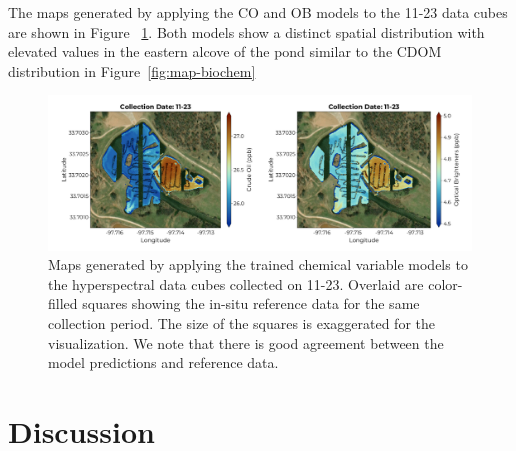 \documentclass[remotesensing,article,submit,pdftex,moreauthors]{Definitions/mdpi}
\begin{document}
The maps generated by applying the CO and OB models to the 11-23 data cubes are shown in Figure ~\ref{fig:map-chem}. Both models show a distinct spatial distribution with elevated values in the eastern alcove of the pond similar to the CDOM distribution in Figure~\ref{fig:map-biochem}

\begin{figure}
\centering
\includegraphics[width=\columnwidth]{paper/figures/results/maps/chemical.pdf}
\caption{Maps generated by applying the trained chemical variable models to the hyperspectral data cubes collected on 11-23. Overlaid are color-filled squares showing the in-situ reference data for the same collection period. The size of the squares is exaggerated for the visualization. We note that there is good agreement between the model predictions and reference data.\label{fig:map-chem}}
\end{figure}  





\section{Discussion} \label{sec:discussion}
\end{document}
